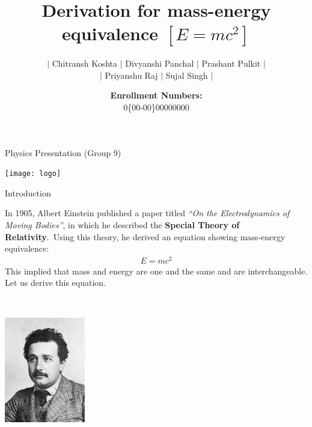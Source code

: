 \documentclass[11pt]{beamer}
\title[Derivation for mass-energy equivalence] {Derivation for mass-energy equivalence $[E = mc^2]$}
\author[Chitransh, Divyanshi, Prashant...]
{\(|\) Chitransh Koshta \(|\) Divyanshi Panchal \(|\) Prashant Pulkit \(|\)\\\(|\) Priyanshu Raj
    \(|\) Sujal Singh \(|\)}
\date[Priyanshu, Sujal]{\textbf{Enrollment Numbers:}\\0\{00-00\}00000000}
\begin{document}
    \begin{frame}{Physics Presentation (Group 9)}
        \begin{center}
            \texttt{[image: logo]}
        \end{center}\vspace*{-10pt}
        \maketitle
    \end{frame}

    \begin{frame}[t]{Introduction}
        \begin{minipage}[t]{0.65\textwidth}
            In 1905, Albert Einstein published a paper titled \textit{``On the Electrodynamics of Moving Bodies''},
            in which he described the \textbf{Special Theory of Relativity}.\ Using this theory, he derived an equation
            showing mass-energy equivalence:
            \begin{align*}
                E = mc^2
            \end{align*}
            This implied that mass and energy are one and the same and are interchangeable.\\[10pt]
            Let us derive this equation.
        \end{minipage}
        \begin{minipage}[t]{0.05\textwidth}
            ~
        \end{minipage}
        \begin{minipage}[t]{0.1\textwidth}
            \begin{center}
                \vspace*{-10pt}
                \includegraphics[width=100pt]{albert}
            \end{center}
        \end{minipage}
    \end{frame}
\end{document}
